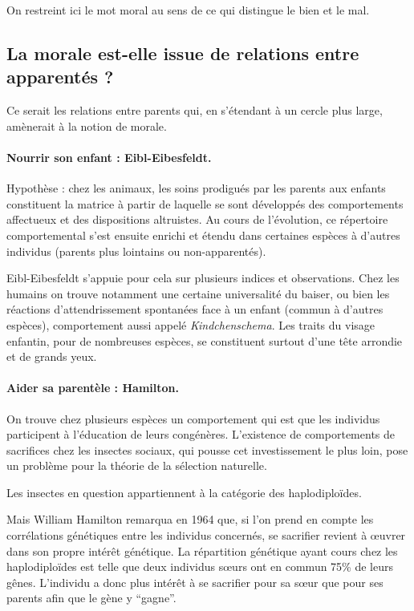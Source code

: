 On restreint ici le mot moral au sens de ce qui distingue le bien et le mal.

\subsection{La morale est-elle issue de relations entre apparentés ?}
    Ce serait les relations entre parents qui, en s'étendant à un cercle plus large, amènerait à la notion de morale.

    \paragraph{Nourrir son enfant : Eibl-Eibesfeldt.}
    Hypothèse : chez les animaux, les soins prodigués par les parents aux enfants constituent la matrice à partir de laquelle se sont développés des comportements affectueux et des dispositions altruistes.
    Au cours de l'évolution, ce répertoire comportemental s’est ensuite enrichi et étendu dans certaines espèces à d’autres individus (parents plus lointains ou non-apparentés).
    
    Eibl-Eibesfeldt s'appuie pour cela sur plusieurs indices et observations.
    Chez les humains on trouve notamment une certaine universalité du baiser, ou bien les réactions d'attendrissement spontanées face à un enfant (commun à d'autres espèces), comportement aussi appelé \textit{Kindchenschema}.
    Les traits du visage enfantin, pour de nombreuses espèces, se constituent surtout d’une tête arrondie et de grands yeux.
    
    \paragraph{Aider sa parentèle : Hamilton.}
    On trouve chez plusieurs espèces un comportement qui est que les individus participent à l'éducation de leurs congénères.
    L'existence de comportements de sacrifices chez les insectes sociaux, qui pousse cet investissement le plus loin, pose un problème pour la théorie de la sélection naturelle.

	Les insectes en question appartiennent à la catégorie des haplodiploïdes.
	
	Mais William Hamilton remarqua en 1964 que, si l'on prend en compte les corrélations génétiques entre les individus concernés, se sacrifier revient à œuvrer dans son propre intérêt génétique.
	La répartition génétique ayant cours chez les haplodiploïdes est telle que deux individus sœurs ont en commun 75\% de leurs gênes.
	L'individu a donc plus intérêt à se sacrifier pour sa sœur que pour ses parents afin que le gène y “gagne”.

